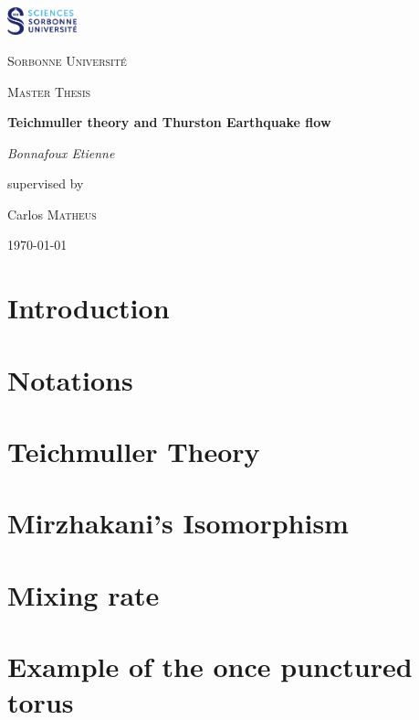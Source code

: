 \documentclass[12pt]{article}
\theoremstyle{plain}%
\theoremstyle{definition}
\theoremstyle{remark}
\begin{document}

\begin{titlepage}
	\centering
	\includegraphics[width=0.15\textwidth]{Image/Sorbonne.png}\par\vspace{1cm}
	{\scshape\LARGE Sorbonne Université \par}
	\vspace{1cm}
	{\scshape\Large Master Thesis\par}
	\vspace{1.5cm}
	{\huge\bfseries Teichmuller theory and Thurston Earthquake flow\par}
	\vspace{2cm}
	{\Large\itshape Bonnafoux Etienne\par}
	\vfill
	supervised by\par
	Carlos \textsc{Matheus}

	\vfill

	{\large \today\par}
\end{titlepage}

\newpage


\newpage

\tableofcontents
\newpage

\section{Introduction}

\newpage

\section{Notations}
\printnomenclature

\newpage

\section{Teichmuller Theory}

\newpage

\section{Mirzhakani's Isomorphism}

\newpage

\section{Mixing rate}

\newpage

\section{Example of the once punctured torus}

\newpage



\end{document}
